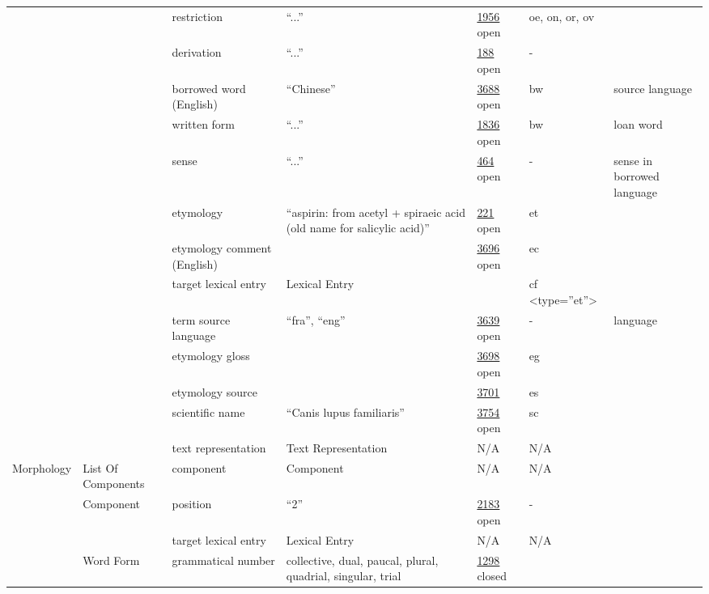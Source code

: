 \documentclass[a4paper,12pt]{article}
\begin{document}
\begin{center}
\begin{longtable}{*7{p{2cm}}}
& & restriction & ``...'' & \href{http://www.isocat.org/datcat/DC-1956}{1956} open & oe, on, or, ov & \\ \cmidrule{3-7}
& & derivation & ``...'' & \href{http://www.isocat.org/datcat/DC-188}{188} open & - & \\ \cmidrule{3-7}
& & borrowed word (English) & ``Chinese'' & \href{http://www.isocat.org/datcat/DC-3688}{3688} open & bw & source language \\ \cmidrule{3-7}
& & written form & ``...'' & \href{http://www.isocat.org/datcat/DC-1836}{1836} open & bw & loan word \\ \cmidrule{3-7}
& & sense & ``...'' & \href{http://www.isocat.org/datcat/DC-464}{464} open & - & sense in borrowed language \\ \cmidrule{3-7}
& & etymology & ``aspirin: from acetyl + spiraeic acid (old name for salicylic acid)'' & \href{http://www.isocat.org/datcat/DC-221}{221} open & et & \\ \cmidrule{3-7}
& & etymology comment (English) & & \href{http://www.isocat.org/datcat/DC-3696}{3696} open & ec & \\ \cmidrule{3-7}
& & target lexical entry & Lexical Entry & & cf \textless type=''et''\textgreater & \\ \cmidrule{3-7}
& & term source language & ``fra'', ``eng'' & \href{http://www.isocat.org/datcat/DC-3639}{3639} open & - & language \\ \cmidrule{3-7}
& & etymology gloss & & \href{http://www.isocat.org/datcat/DC-3698}{3698} open & eg & \\ \cmidrule{3-7}
& & etymology source & & \href{http://www.isocat.org/datcat/DC-3701}{3701} & es & \\ \cmidrule{3-7}
& & scientific name & ``Canis lupus familiaris'' & \href{http://www.isocat.org/datcat/DC-3754}{3754} open & sc & \\ \cmidrule{3-7}
& & text representation & Text Re\-pre\-sen\-ta\-tion & N/A & N/A & \\ \cmidrule{1-7}
\multirow{18}{2cm}{Morphology} &List Of Components & component & Component & N/A & N/A & \\ \cmidrule{2-7}
& \multirow{2}{2cm}{Component} & position & ``2'' & \href{http://www.isocat.org/datcat/DC-2183}{2183} open & - & \\ \cmidrule{3-7}
& & target lexical entry & Lexical Entry & N/A & N/A & \\ \cmidrule{2-7}
& \multirow{10}{2cm}{Word Form} & grammatical number & collective, dual, paucal, plural, quadrial, singular, trial & \href{http://www.isocat.org/datcat/DC-1298}{1298} closed & & \\ \cmidrule{3-7}

\end{longtable}
\end{center}
\end{document}
